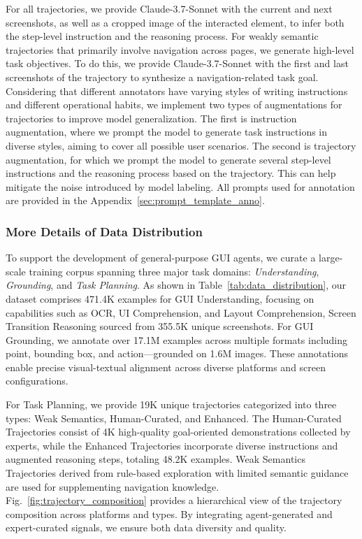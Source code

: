 For all trajectories, we provide Claude-3.7-Sonnet with the current and next screenshots, as well as a cropped image of the interacted element, to infer both the step-level instruction and the reasoning process.
%
For weakly semantic trajectories that primarily involve navigation across pages, we generate high-level task objectives. To do this, we provide Claude-3.7-Sonnet with the first and last screenshots of the trajectory to synthesize a navigation-related task goal.
%
Considering that different annotators have varying styles of writing instructions and different operational habits, we implement two types of augmentations for trajectories to improve model generalization. The first is instruction augmentation, where we prompt the model to generate task instructions in diverse styles, aiming to cover all possible user scenarios. The second is trajectory augmentation, for which we prompt the model to generate several step-level instructions and the reasoning process based on the trajectory. This can help mitigate the noise introduced by model labeling. All prompts used for annotation are provided in the Appendix~\ref{sec:prompt_template_anno}.

\subsubsection{More Details of Data Distribution}
To support the development of general-purpose GUI agents, we curate a large-scale training corpus spanning three major task domains: \textit{Understanding}, \textit{Grounding}, and \textit{Task Planning}. As shown in Table~\ref{tab:data_distribution}, our dataset comprises 471.4K examples for GUI Understanding, focusing on capabilities such as OCR, UI Comprehension, and Layout Comprehension, Screen Transition Reasoning sourced from 355.5K unique screenshots. For GUI Grounding, we annotate over 17.1M examples across multiple formats including point, bounding box, and action—grounded on 1.6M images. These annotations enable precise visual-textual alignment across diverse platforms and screen configurations.

For Task Planning, we provide 19K unique trajectories categorized into three types: Weak Semantics, Human-Curated, and Enhanced. The Human-Curated Trajectories consist of 4K high-quality goal-oriented demonstrations collected by experts, while the Enhanced Trajectories incorporate diverse instructions and augmented reasoning steps, totaling 48.2K examples. Weak Semantics Trajectories derived from rule-based exploration with limited semantic guidance are used for supplementing navigation knowledge. Fig.~\ref{fig:trajectory_composition} provides a hierarchical view of the trajectory composition across platforms and types. By integrating agent-generated and expert-curated signals, we ensure both data diversity and quality.


